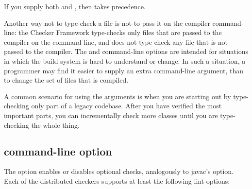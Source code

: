 If you supply both  and , then
 takes precedence.

Another way not to type-check a file is not to pass it on the compiler
command-line:  the Checker Framework type-checks only files that are passed
to the compiler on the command line, and does not type-check any file that
is not passed to the compiler.  The  and 
command-line options
are intended for situations in which the build system is hard to understand
or change.  In such a situation, a programmer may find it easier to supply
an extra command-line argument, than to change the set of files that is
compiled.

A common scenario for using the arguments is when you are starting out by
type-checking only part of a legacy codebase.  After you have verified the
most important parts, you can incrementally check more classes until you
are type-checking the whole thing.


\subsection{ command-line option\label{alint}}

\label{lint-options}

The  option enables or disables optional checks, analogously to
javac's  option.
Each of the distributed checkers supports at least the following lint options:




